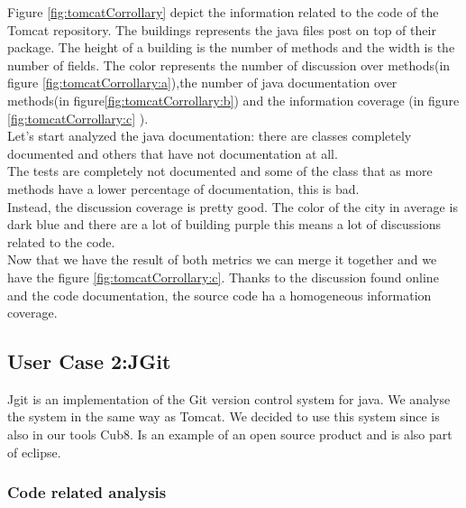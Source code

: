 \documentclass[]{usiinfbachelorproject}
\begin{document}
Figure \ref{fig:tomcatCorrollary} depict the information related to the code of the Tomcat repository. The buildings represents the java files post on top of their package. The height of a building is the number of methods and the width is the number of fields. The color represents the number of discussion over methods(in figure \ref{fig:tomcatCorrollary:a}),the number of java documentation over methods(in  figure\ref{fig:tomcatCorrollary:b}) and the information coverage (in figure \ref{fig:tomcatCorrollary:c} ).\\
Let's start analyzed the java documentation: there are classes completely documented and others that have not documentation at all.\\
The tests are completely not documented and some of the class that as more methods have a lower percentage of documentation, this is bad.\\
Instead, the discussion coverage is pretty good. The color of the city in average is dark blue and there are a lot of building purple this means a lot of discussions related to the code. \\
Now that we have the result of both metrics we can merge it together and we have the figure \ref{fig:tomcatCorrollary:c}. Thanks to the discussion found online and the code documentation, the source code ha a homogeneous information coverage.
 

 

\newpage



\subsection{User Case 2:JGit}
	Jgit is an implementation of the Git version control system for java. We analyse the system in the same way as Tomcat. We decided to use this system since is also in our tools Cub8. Is an example of an open source product and is also part of eclipse.


\subsubsection{Code related analysis}
\end{document}
